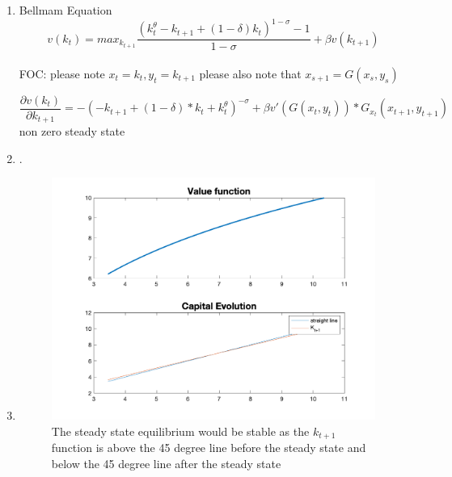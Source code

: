 \begin{enumerate}
    \item  Bellmam Equation $$v(k_t)= max_{k_{t+1}} \frac{(k_t^\theta -k_{t+1}+(1-\delta)k_t)^{1-\sigma}-1}{1-\sigma}+\beta v(k_{t+1})$$\\
    FOC: please note $x_t=k_t, y_t=k_{t+1}$ please also note that $x_{s+1}=G(x_s,y_s)$
    
    $$\frac{\partial v(k_t)}{\partial k_{t+1}}=-( -k_{t+1} + (1-\delta)*k_t +k_t^\theta)^{-\sigma}
   +\beta v'(G(x_t,y_t))*G_{x_t}(x_{t+1},y_{t+1})$$
   non zero steady state 
   $$$$
   \item. 
   \item
   \begin{figure}[h]
       \centering
       \includegraphics[width = .8\linewidth]{HW3/pics/HW3_Q2_figure.png}
       \caption{The steady state equilibrium would be stable as the $k_{t+1}$ function is above the 45 degree line before the steady state and below the 45 degree line after the steady state}
       \label{fig:my_label}
   \end{figure}
\end{enumerate}